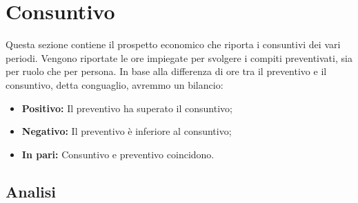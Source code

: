 \section{Consuntivo}
Questa sezione contiene il prospetto economico che riporta i consuntivi dei vari periodi. Vengono riportate le ore impiegate per svolgere i compiti preventivati, sia per ruolo che per persona. In base alla differenza di ore tra il preventivo e il consuntivo, detta conguaglio, avremmo un bilancio: \\
\begin{itemize}
	\item \textbf{Positivo:} Il preventivo ha superato il consuntivo;
	\item \textbf{Negativo:} Il preventivo è inferiore al consuntivo;
	\item \textbf{In pari:} Consuntivo e preventivo coincidono. \\
\end{itemize}
	\subsection{Analisi}
